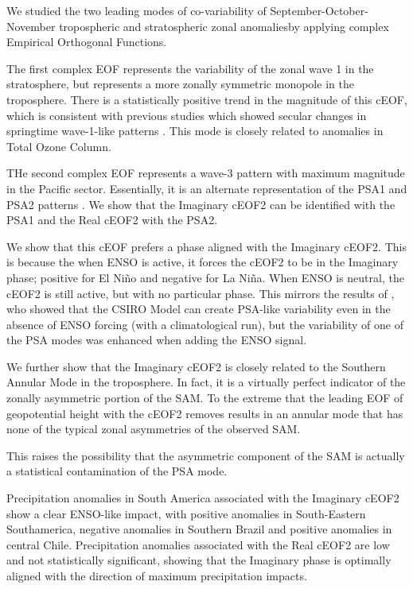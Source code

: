 \documentclass[smallextended]{svjour3}       %
\begin{document}
We studied the two leading modes of co-variability of September-October-November tropospheric and stratospheric zonal anomaliesby applying complex Empirical Orthogonal Functions.

The first complex EOF represents the variability of the zonal wave 1 in the stratosphere, but represents a more zonally symmetric monopole in the troposphere. There is a statistically positive trend in the magnitude of this cEOF, which is consistent with previous studies which showed secular changes in springtime wave-1-like patterns \citep[e.g.][]{raphael2003}. This mode is closely related to anomalies in Total Ozone Column.

THe second complex EOF represents a wave-3 pattern with maximum magnitude in the Pacific sector. Essentially, it is an alternate representation of the PSA1 and PSA2 patterns \citep{mo2001}. We show that the Imaginary cEOF2 can be identified with the PSA1 and the Real cEOF2 with the PSA2.

We show that this cEOF prefers a phase aligned with the Imaginary cEOF2. This is because the when ENSO is active, it forces the cEOF2 to be in the Imaginary phase; positive for El Niño and negative for La Niña. When ENSO is neutral, the cEOF2 is still active, but with no particular phase. This mirrors the results of \citet{cai2002}, who showed that the CSIRO Model can create PSA-like variability even in the absence of ENSO forcing (with a climatological run), but the variability of one of the PSA modes was enhanced when adding the ENSO signal.

We further show that the Imaginary cEOF2 is closely related to the Southern Annular Mode in the troposphere. In fact, it is a virtually perfect indicator of the zonally asymmetric portion of the SAM. To the extreme that the leading EOF of geopotential height with the cEOF2 removes results in an annular mode that has none of the typical zonal asymmetries of the observed SAM.

This raises the possibility that the asymmetric component of the SAM is actually a statistical contamination of the PSA mode.

Precipitation anomalies in South America associated with the Imaginary cEOF2 show a clear ENSO-like impact, with positive anomalies in South-Eastern Southamerica, negative anomalies in Southern Brazil and positive anomalies in central Chile. Precipitation anomalies associated with the Real cEOF2 are low and not statistically significant, showing that the Imaginary phase is optimally aligned with the direction of maximum precipitation impacts.
\end{document}
